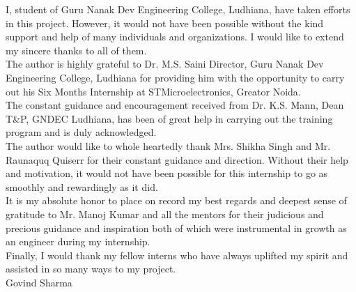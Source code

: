 \begin{Large}
\end{Large}
\noindent I, student of Guru Nanak Dev Engineering College, Ludhiana, have taken efforts in this project. However, it would not have been possible without the kind support and help of many individuals and organizations. I would like to extend my sincere thanks to all of them.\\

\noindent The author is highly grateful to Dr. M.S. Saini Director, Guru Nanak Dev Engineering College, Ludhiana for providing him with the opportunity to carry out his Six Months Internship at STMicroelectronics, Greator Noida.\\

\noindent The constant guidance and encouragement received from Dr. K.S. Mann, Dean T\&P, GNDEC Ludhiana, has been of great help in carrying out the training program and is duly acknowledged.\\

\noindent The author would like to whole heartedly thank Mrs. Shikha Singh and Mr. Raunaquq Quiserr for their constant guidance and direction. Without their help and motivation, it would not have been possible for this internship to go as smoothly and rewardingly as it did.\\

\noindent It is my absolute honor to place on record my best regards and deepest sense of gratitude to Mr. Manoj Kumar and all the mentors for their judicious and precious guidance and inspiration both of which were instrumental in growth as an engineer during my internship.\\

\noindent Finally, I would thank my fellow interns who have always uplifted my spirit and assisted in so many ways to my project.\\

\noindent Govind Sharma
